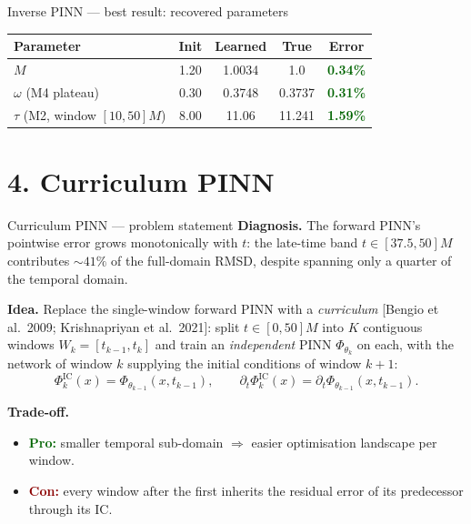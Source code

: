 \documentclass[aspectratio=169, 11pt]{beamer}
\begin{document}
\begin{frame}{Inverse PINN --- best result: recovered parameters}
  \centering
  \renewcommand{\arraystretch}{1.25}
  \begin{tabular}{@{}lcccc@{}}
    \toprule
    \textbf{Parameter} & \textbf{Init} & \textbf{Learned} & \textbf{True} & \textbf{Error} \\
    \midrule
    $M$              & 1.20 & 1.0034 & 1.0    & \textcolor{darkgreen}{\textbf{0.34\%}} \\
    $\omega$ (M4 plateau)            & 0.30 & 0.3748 & 0.3737 & \textcolor{darkgreen}{\textbf{0.31\%}} \\
    $\tau$  (M2, window $[10,50]M$)  & 8.00 & 11.06  & 11.241 & \textcolor{darkgreen}{\textbf{1.59\%}} \\
    \bottomrule
  \end{tabular}
  \vspace{6mm}

\end{frame}


\section{4. Curriculum PINN}

\begin{frame}{Curriculum PINN --- problem statement}
  \textbf{Diagnosis.} The forward PINN's pointwise error grows
  monotonically with $t$: the late-time band $t\!\in\![37.5,50]M$
  contributes $\sim\!41\%$ of the full-domain RMSD, despite spanning
  only a quarter of the temporal domain.
  \medskip

  \textbf{Idea.} Replace the single-window forward PINN with a
  \emph{curriculum} [Bengio et al.\ 2009; Krishnapriyan et al.\ 2021]:
  split $t\!\in\![0,50]M$ into $K$ contiguous windows
  $W_{k}=[t_{k-1},t_{k}]$ and train an \emph{independent} PINN
  $\Phi_{\theta_{k}}$ on each, with the network of window $k$ supplying
  the initial conditions of window $k\!+\!1$:
  \[
    \Phi^{\mathrm{IC}}_{k}(x) = \Phi_{\theta_{k-1}}(x,t_{k-1}),\qquad
    \partial_{t}\Phi^{\mathrm{IC}}_{k}(x)
       = \partial_{t}\Phi_{\theta_{k-1}}(x,t_{k-1}).
  \]
  \medskip

  \textbf{Trade-off.}
  \begin{itemize}\small
    \item \textcolor{darkgreen}{\textbf{Pro:}} smaller temporal sub-domain $\Rightarrow$
          easier optimisation landscape per window.
    \item \textcolor{darkred}{\textbf{Con:}} every window after the first inherits
          the residual error of its predecessor through its IC.
  \end{itemize}
\end{frame}
\end{document}
